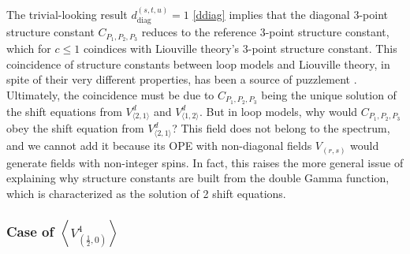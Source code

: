 \documentclass[12pt, a4paper]{article}
\theoremstyle{break}
\begin{document}
The trivial-looking result $d_\text{diag}^{(s,t,u)} = 1$ \eqref{ddiag} implies that the diagonal 3-point structure constant $C_{P_1,P_2,P_3}$ reduces to the reference 3-point structure constant, which for $c\leq 1$ coindices with Liouville theory's 3-point structure constant. This coincidence of structure constants between loop models and Liouville theory, in spite of their very different properties, has been a source of puzzlement \cite{ijs15, rib22}. Ultimately, the coincidence must be due to $C_{P_1,P_2,P_3}$ being the unique solution of 
the shift equations from $V^d_{\langle 2,1\rangle}$ and $V^d_{\langle 1,2\rangle}$. But in loop models, why would $C_{P_1,P_2,P_3}$ obey the shift equation from $V^d_{\langle 2,1\rangle}$? This field does not belong to the spectrum, and we cannot add it because its OPE with non-diagonal fields $V_{(r,s)}$ would generate fields with non-integer spins. In fact, this raises the more general issue of explaining why structure constants are built from the double Gamma function, which is characterized as the solution of 2 shift equations.

\subsubsection[Case of $\left<V_{(\frac12, 0)}^4\right>$]{Case of $\left<V_{(\frac12, 0)}^4\right>$ \pice}
\end{document}
